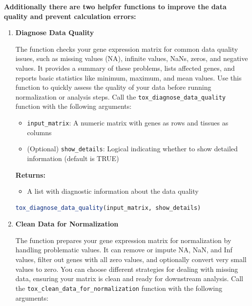 \begin{enumerate}
          \textbf{Additionally there are two helpfer functions to improve the data
          quality and prevent calculation errors:}
          \begin{enumerate}
            \item \textbf{Diagnose Data Quality}
                  
                  The function checks your gene expression matrix for common data quality
                  issues, such as missing values (NA), infinite values, NaNs, zeros, and
                  negative values. It provides a summary of these problems, lists
                  affected genes, and reports basic statistics like minimum, maximum, and
                  mean values. Use this function to quickly assess the quality of your
                  data before running normalization or analysis steps. Call the \texttt{tox\_diagnose\_data\_quality}
                  function with the following arguments:
                  
                  \begin{itemize}
                    \item \texttt{input\_matrix}: A numeric matrix with genes as rows and
                          tissues as columns
                          
                    \item (Optional) \texttt{show\_details}: Logical indicating whether to
                          show detailed information (default is TRUE)
                  \end{itemize}
                  
                  \textbf{Returns:}
                  \begin{itemize}
                    \item A list with diagnostic information about the data quality
                  \end{itemize}
                  
                  \begin{lstlisting}[language=R, caption={R Diagnose Data Quality}]
tox_diagnose_data_quality(input_matrix, show_details)
                  \end{lstlisting}
                  
            \item \textbf{Clean Data for Normalization}
                  
                  The function prepares your gene expression matrix for normalization by
                  handling problematic values. It can remove or impute NA, NaN, and Inf
                  values, filter out genes with all zero values, and optionally convert
                  very small values to zero. You can choose different strategies for dealing
                  with missing data, ensuring your matrix is clean and ready for
                  downstream analysis. Call the \texttt{tox\_clean\_data\_for\_normalization}
                  function with the following arguments:
                  

\end{enumerate}
\end{enumerate}
